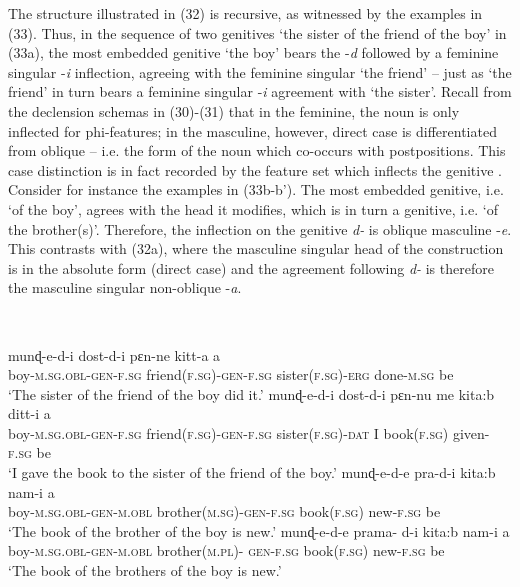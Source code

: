 \documentclass[output=paper]{langsci/langscibook}
\begin{document}
The structure illustrated in (32) is recursive, as witnessed by the examples in (33). Thus, in the sequence of two genitives ‘the sister of the friend of the boy’ in (33a), the most embedded genitive ‘the boy’ bears the -\textit{d}  followed by a feminine singular -\textit{i} inflection, agreeing with the feminine singular ‘the friend’ – just as ‘the friend’ in turn bears a feminine singular -\textit{i} agreement with ‘the sister’. Recall from the declension schemas in (30)-(31) that in the feminine, the noun is only inflected for phi-features; in the masculine, however, direct case is differentiated from oblique – i.e. the form of the noun which co-occurs with postpositions. This case distinction is in fact recorded by the feature set which inflects the genitive . Consider for instance the examples in (33b-b’). The most embedded genitive, i.e. ‘of the boy’, agrees with the head it modifies, which is in turn a genitive, i.e. ‘of the brother(s)’. Therefore, the inflection on the genitive  \textit{d-} is oblique masculine -\textit{e}. This contrasts with (32a), where the masculine singular head of the construction is in the absolute form (direct case) and the agreement following \textit{d-} is therefore the masculine singular non-oblique -\textit{a}.

\ea%
    \label{ex:manzini:33}\\
    \begin{xlista}
    \ex
    \gll     munɖ-e-d-i   dost-d-i   pɛn-ne    kitt-a         a  \\
             boy-\textsc{m.sg.obl-gen-f.sg}  friend\textsc{(f.sg)-gen-f.sg}  sister\textsc{(f.sg)-erg}    done-\textsc{m.sg}   be\\
    \glt     ‘The sister of the friend of the boy did it.’
    \gll    munɖ-e-d-i    dost-d-i   pɛn-nu  me  kita:b         ditt-i   a \\
             boy-\textsc{m.sg.obl-gen-f.sg}  friend\textsc{(f.sg)-gen-f.sg}  sister\textsc{(f.sg)-dat}   I          book\textsc{(f.sg)}   given\textsc{{}-f.sg}   be\\
    \glt     ‘I gave the book to the sister of the friend of the boy.’
    \ex      
    \gll    munɖ-e-d-e   pra-d-i   kita:b   nam-i    a \\
             boy-\textsc{m.sg.obl-gen-m.obl}  brother\textsc{(m.sg)-gen-f.sg}  book\textsc{(f.sg)}   new-\textsc{f.sg} be \\
    \glt     ‘The book of the brother of the boy is new.’
    \gll     munɖ-e-d-e   prama-  d-i   kita:b   nam-i       a\\
             boy-\textsc{m.sg.obl-gen-m.obl}  brother\textsc{(m.pl)-}  \textsc{gen-f.sg}   book\textsc{(f.sg)}   new-\textsc{f.sg} be \\
    \glt     ‘The book of the brothers of the boy is new.’
    \end{xlista}
    \z
    
\end{document}
